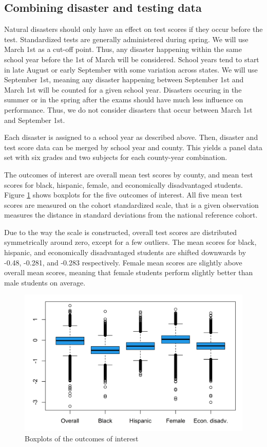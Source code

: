 \subsection{Combining disaster and testing data}

Natural disasters should only have an effect on test scores if they occur before the test. Standardized tests are generally administered during spring. We will use March 1st as a cut-off point. Thus, any disaster happening within the same school year before the 1st of March will be considered. School years tend to start in late August or early September with some variation across states. We will use September 1st, meaning any disaster happening between September 1st and March 1st will be counted for a given school year. Disasters occuring in the summer or in the spring after the exams should have much less influence on performance. Thus, we do not consider disasters that occur between March 1st and September 1st.

Each disaster is assigned to a school year as described above. Then, disaster and test score data can be merged by school year and county. This yields a panel data set with six grades and two subjects for each county-year combination.

The outcomes of interest are overall mean test scores by county, and mean test scores for black, hispanic, female, and economically disadvantaged students. Figure \ref{DepVarsBoxplot} shows boxplots for the five outcomes of interest. All five mean test scores are measured on the cohort standardized scale, that is a given observation measures the distance in standard deviations from the national reference cohort. 

Due to the way the scale is constructed, overall test scores are distributed symmetrically around zero, except for a few outliers. The mean scores for black, hispanic, and economically disadvantaged students are shifted downwards by -0.48, -0.281, and -0.283 respectively. Female mean scores are slightly above overall mean scores, meaning that female students perform slightly better than male students on average.

\begin{figure}[!h]
	\centering
	\includegraphics[scale=1]{"../Code & Data/DepVarsBoxplot.png"}
	\caption{Boxplots of the outcomes of interest}
	\label{DepVarsBoxplot}
\end{figure}








